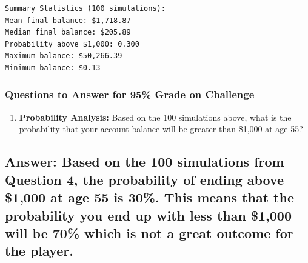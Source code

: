 \documentclass[
  letterpaper,
  DIV=11,
  numbers=noendperiod]{scrartcl}
\providecommand{\tightlist}{%
  \setlength{\itemsep}{0pt}\setlength{\parskip}{0pt}}
\theoremstyle{definition}
\theoremstyle{remark}
\begin{document}
\begin{verbatim}
Summary Statistics (100 simulations):
Mean final balance: $1,718.87
Median final balance: $205.89
Probability above $1,000: 0.300
Maximum balance: $50,266.39
Minimum balance: $0.13
\end{verbatim}

\subsubsection{Questions to Answer for 95\% Grade on
Challenge}\label{questions-to-answer-for-95-grade-on-challenge}

\begin{enumerate}
\def\labelenumi{\arabic{enumi}.}
\setcounter{enumi}{4}
\tightlist
\item
  \textbf{Probability Analysis:} Based on the 100 simulations above,
  what is the probability that your account balance will be greater than
  \$1,000 at age 55?
\end{enumerate}

\subsection{Answer: Based on the 100 simulations from Question 4, the
probability of ending above \$1,000 at age 55 is 30\%. This means that
the probability you end up with less than \$1,000 will be 70\% which is
not a great outcome for the
player.}\label{answer-based-on-the-100-simulations-from-question-4-the-probability-of-ending-above-1000-at-age-55-is-30.-this-means-that-the-probability-you-end-up-with-less-than-1000-will-be-70-which-is-not-a-great-outcome-for-the-player.}
\end{document}
